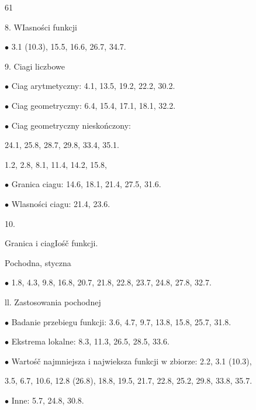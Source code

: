 \documentclass[a4paper,12pt]{article}
\begin{document}
61

8. WIasności funkcji

$\bullet$ 3.1 (10.3), 15.5, 16.6, 26.7, 34.7.

9. Ciagi liczbowe

$\bullet$ Ciag arytmetyczny: 4.1, 13.5, 19.2, 22.2, 30.2.

$\bullet$ Ciag geometryczny: 6.4, 15.4, 17.1, 18.1, 32.2.

$\bullet$ Ciag geometryczny nieskończony:

24.1, 25.8, 28.7, 29.8, 33.4, 35.1.

1.2, 2.8, 8.1, 11.4, 14.2, 15.8,

$\bullet$ Granica ciagu: 14.6, 18.1, 21.4, 27.5, 31.6.

$\bullet$ Wlasności ciagu: 21.4, 23.6.

10.

Granica i ciagIośč funkcji.

Pochodna, styczna

$\bullet$ 1.8, 4.3, 9.8, 16.8, 20.7, 21.8, 22.8, 23.7, 24.8, 27.8, 32.7.

ll. Zastosowania pochodnej

$\bullet$ Badanie przebiegu funkcji: 3.6, 4.7, 9.7, 13.8, 15.8, 25.7, 31.8.

$\bullet$ Ekstrema lokalne: 8.3, 11.3, 26.5, 28.5, 33.6.

$\bullet$ Wartośč najmniejsza $\mathrm{i}$ najwieksza funkcji $\mathrm{w}$ zbiorze: 2.2, 3.1 (10.3),

3.5, 6.7, 10.6, 12.8 (26.8), 18.8, 19.5, 21.7, 22.8, 25.2, 29.8, 33.8, 35.7.

$\bullet$ Inne: 5.7, 24.8, 30.8.
\end{document}
